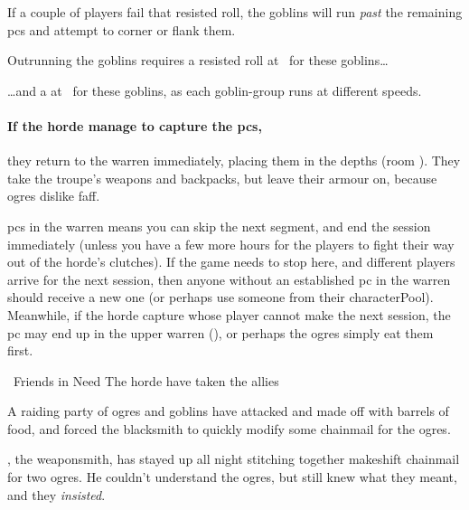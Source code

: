 If a couple of players fail that resisted  roll, the goblins will run \emph{past} the remaining \glspl{pc} and attempt to corner or flank them.%

\goblin

Outrunning the goblins requires a resisted  roll at \tn\ for these goblins\ldots

\goblin

\ldots and a  at \tn\ for these goblins, as each goblin-group runs at different speeds.

\goblin

\paragraph{If the horde manage to capture the \glspl{pc},}
they return to the \gls{warren} immediately, placing them in the depths (room ).
They take the troupe's weapons and backpacks, but leave their armour on, because \glspl{ogre} dislike faff.

\Glspl{pc} in the \gls{warren} means you can skip the next \gls{segment}, and end the session immediately (unless you have a few more hours for the players to fight their way out of the horde's clutches).
If the game needs to stop here, and different players arrive for the next session, then anyone without an established \gls{pc} in the \gls{warren} should receive a new one (or perhaps use someone from their \gls{characterPool}).
Meanwhile, if the horde capture  whose player cannot make the next session, the \gls{pc} may end up in the upper warren (), or perhaps the \glspl{ogre} simply eat them first.


{~Friends in Need}%
{The horde have taken the  allies}%

\begin{exampletext}
  A raiding party of \glspl{ogre} and goblins have attacked  and made off with barrels of food, and forced the blacksmith to quickly modify some chainmail for the \glspl{ogre}.
\end{exampletext}

\composeHumanName, the weaponsmith, has stayed up all night stitching together makeshift chainmail for two \glspl{ogre}.
He couldn't understand the \glspl{ogre}, but still knew what they meant, and they \emph{insisted}.


